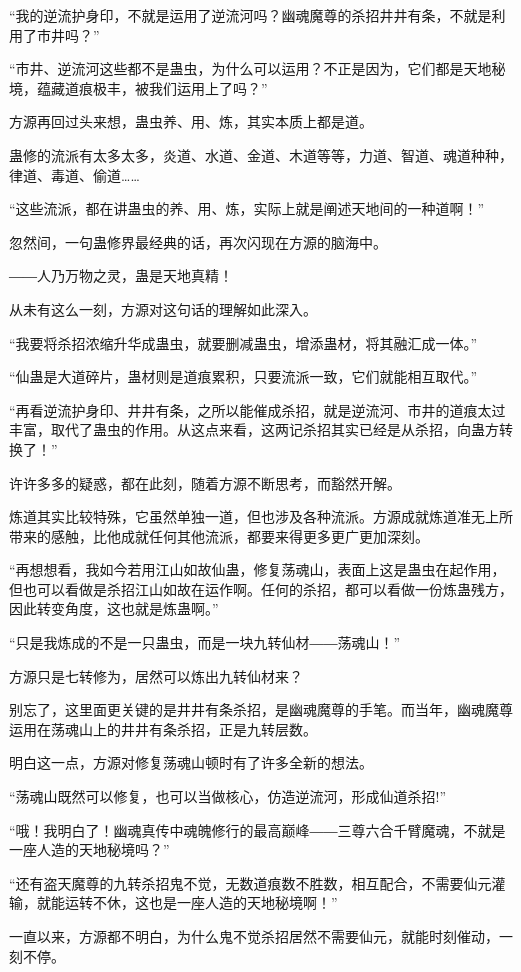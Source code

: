 \begin{this_body}
“我的逆流护身印，不就是运用了逆流河吗？幽魂魔尊的杀招井井有条，不就是利用了市井吗？”

“市井、逆流河这些都不是蛊虫，为什么可以运用？不正是因为，它们都是天地秘境，蕴藏道痕极丰，被我们运用上了吗？”

方源再回过头来想，蛊虫养、用、炼，其实本质上都是道。

蛊修的流派有太多太多，炎道、水道、金道、木道等等，力道、智道、魂道种种，律道、毒道、偷道……

“这些流派，都在讲蛊虫的养、用、炼，实际上就是阐述天地间的一种道啊！”

忽然间，一句蛊修界最经典的话，再次闪现在方源的脑海中。

――人乃万物之灵，蛊是天地真精！

从未有这么一刻，方源对这句话的理解如此深入。

“我要将杀招浓缩升华成蛊虫，就要删减蛊虫，增添蛊材，将其融汇成一体。”

“仙蛊是大道碎片，蛊材则是道痕累积，只要流派一致，它们就能相互取代。”

“再看逆流护身印、井井有条，之所以能催成杀招，就是逆流河、市井的道痕太过丰富，取代了蛊虫的作用。从这点来看，这两记杀招其实已经是从杀招，向蛊方转换了！”

许许多多的疑惑，都在此刻，随着方源不断思考，而豁然开解。

炼道其实比较特殊，它虽然单独一道，但也涉及各种流派。方源成就炼道准无上所带来的感触，比他成就任何其他流派，都要来得更多更广更加深刻。

“再想想看，我如今若用江山如故仙蛊，修复荡魂山，表面上这是蛊虫在起作用，但也可以看做是杀招江山如故在运作啊。任何的杀招，都可以看做一份炼蛊残方，因此转变角度，这也就是炼蛊啊。”

“只是我炼成的不是一只蛊虫，而是一块九转仙材――荡魂山！”

方源只是七转修为，居然可以炼出九转仙材来？

别忘了，这里面更关键的是井井有条杀招，是幽魂魔尊的手笔。而当年，幽魂魔尊运用在荡魂山上的井井有条杀招，正是九转层数。

明白这一点，方源对修复荡魂山顿时有了许多全新的想法。

“荡魂山既然可以修复，也可以当做核心，仿造逆流河，形成仙道杀招!”

“哦！我明白了！幽魂真传中魂魄修行的最高巅峰――三尊六合千臂魔魂，不就是一座人造的天地秘境吗？”

“还有盗天魔尊的九转杀招鬼不觉，无数道痕数不胜数，相互配合，不需要仙元灌输，就能运转不休，这也是一座人造的天地秘境啊！”

一直以来，方源都不明白，为什么鬼不觉杀招居然不需要仙元，就能时刻催动，一刻不停。


\end{this_body}
